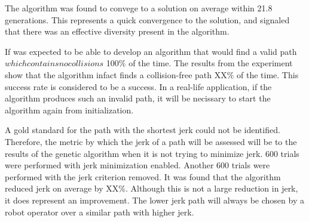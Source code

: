The algorithm was found to convege to a solution on average within 21.8 generations. This represents a quick convergence to the solution, and signaled that there was an effective diversity present in the algorithm.

If was expected to be able to develop an algorithm that would find a valid path \(which contains no collisions\) 100\% of the time. The results from the experiment show that the algorithm infact finds a collision-free path XX\% of the time. This success rate is considered to be a success. In a real-life application, if the algorithm produces such an invalid path, it will be necissary to start the algorithm again from initialization. 

A gold standard for the path with the shortest jerk could not be identified. Therefore, the metric by which the jerk of a path will be assessed will be to the results of the genetic algorithm when it is not trying to minimize jerk. 600 trials were performed with jerk minimization enabled. Another 600 trials were performed with the jerk criterion removed. It was found that the algorithm reduced jerk on average by XX\%. Although this is not a large reduction in jerk, it does represent an improvement. The lower jerk path will always be chosen by a robot operator over a similar path with higher jerk.



